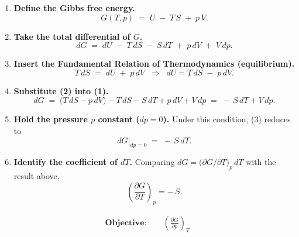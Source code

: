 \documentclass[12pt]{article}
\theoremstyle{definition} %
\theoremstyle{plain} %
\begin{document}
        \begin{enumerate}
        \item \textbf{Define the Gibbs free energy.}
              \[
                G(T,p)\;=\; U \;-\; T\,S \;+\; p\,V .
              \]
        
        \item \textbf{Take the total differential of \(G\).}
              \[
                dG
                \;=\;
                dU \;-\; T\,dS \;-\; S\,dT \;+\; p\,dV \;+\; V\,dp .
                \tag{1}
              \]
        
        \item \textbf{Insert the Fundamental Relation of Thermodynamics (equilibrium).}
              \[
                T\,dS \;=\; dU \;+\; p\,dV
                \;\;\Longrightarrow\;\;
                dU = T\,dS \;-\; p\,dV .
                \tag{2}
              \]
        
        \item \textbf{Substitute (2) into (1).}
              \[
                dG
                \;=\;
                \bigl(T\,dS - p\,dV\bigr)
                - T\,dS
                - S\,dT
                + p\,dV
                + V\,dp
                \;=\;
                -\,S\,dT
                + V\,dp .
                \tag{3}
              \]
        
        \item \textbf{Hold the pressure \(p\) constant (\(dp = 0\)).}
              Under this condition, (3) reduces to
              \[
                dG\big|_{dp = 0} \;=\; -\,S\,dT .
              \]
        
        \item \textbf{Identify the coefficient of \(dT\).}
              Comparing \(dG = \bigl(\partial G/\partial T\bigr)_p\,dT\) with the result above,
              \[
                \boxed{\displaystyle
                  \left(\frac{\partial G}{\partial T}\right)_p = -\,S } .
              \]
        \end{enumerate}
        \begin{align*}
          \textbf{Objective:}\qquad
          \left(\frac{\partial G}{\partial p}\right)_T
          \end{align*}
          
\end{document}
